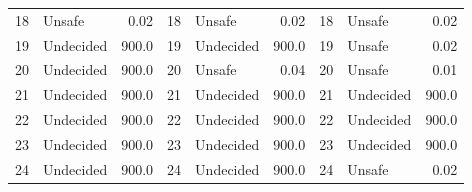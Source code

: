 \begin{table}[!ht]
\begin{tabular}{|llr|llr|llr|}
    18 & Unsafe & 0.02 &    18 & Unsafe & 0.02 &    18 & Unsafe & 0.02\\ 
    19 & Undecided & 900.0 &    19 & Undecided & 900.0 &    19 & Unsafe & 0.02\\ 
    20 & Undecided & 900.0 &    20 & Unsafe & 0.04 &    20 & Unsafe & 0.01\\ 
    21 & Undecided & 900.0 &    21 & Undecided & 900.0 &    21 & Undecided & 900.0\\ 
    22 & Undecided & 900.0 &    22 & Undecided & 900.0 &    22 & Undecided & 900.0\\ 
    23 & Undecided & 900.0 &    23 & Undecided & 900.0 &    23 & Undecided & 900.0\\ 
    24 & Undecided & 900.0 &    24 & Undecided & 900.0 &    24 & Unsafe & 0.02\\ 
    \bottomrule
  \end{tabular}
\end{table}

